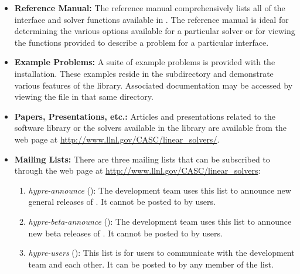 \begin{itemize}

\item
{\bf Reference Manual:} The reference manual comprehensively lists all
of the interface and solver functions available in \hypre{}.  The
reference manual is ideal for determining the various options
available for a particular solver or for viewing the functions
provided to describe a problem for a particular interface. 

\item{\bf Example Problems:} A suite of example problems is provided
with the \hypre{} installation.  These examples reside in the 
subdirectory and demonstrate various features of the \hypre{} library.
Associated documentation may be accessed by viewing the 
file in that same directory.

\item
{\bf Papers, Presentations, etc.:} Articles and presentations related to the
\hypre{} software library or the solvers available
in the library are available from the \hypre{} web page at
\url{http://www.llnl.gov/CASC/linear\_solvers/}.

\item{\bf Mailing Lists:} There are three \hypre{} mailing lists that can be subscribed to through the
\hypre{} web page at \url{http://www.llnl.gov/CASC/linear\_solvers}:

\begin{enumerate}
\item {\sl hypre-announce} (): The
development team uses this list to announce new general releases of \hypre{}.
It cannot be posted to by users.

\item {\sl hypre-beta-announce} (): The
development team uses this list to announce new beta releases of \hypre{}.  It
cannot be posted to by users.

\item {\sl hypre-users} (): This list is for
\hypre{} users to communicate with the development team and each other.  It can
be posted to by any member of the list.
\end{enumerate}



\end{itemize}


